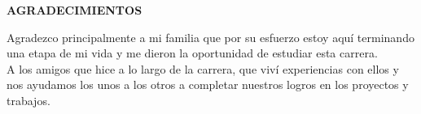 \newpage
\thispagestyle{empty}

\begin{center}
{\bf \Large AGRADECIMIENTOS}
\end{center}

\vspace*{1cm}


Agradezco principalmente a mi familia que por su esfuerzo estoy aquí terminando una etapa de mi vida y me dieron la oportunidad de estudiar esta carrera.\\

A los amigos que hice a lo largo de la carrera, que viví experiencias con ellos y nos ayudamos los unos a los otros a completar nuestros logros en los proyectos y trabajos.\\


\pagebreak